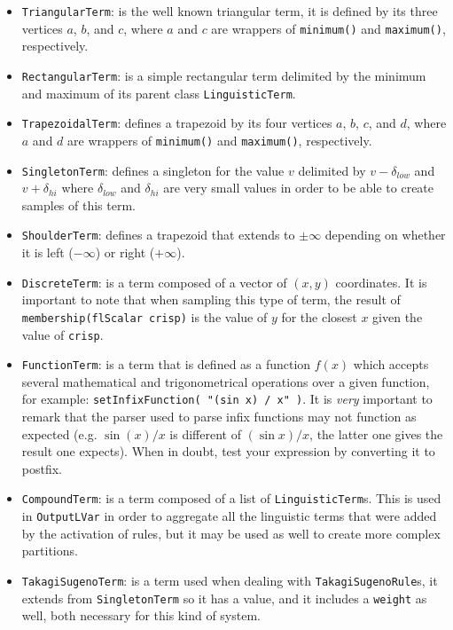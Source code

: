 			\begin{itemize}
				\item \texttt{TriangularTerm}: is the well known triangular term, it is defined by its three vertices $a$, $b$, and $c$, where $a$ and $c$ are wrappers of \texttt{minimum()} and \texttt{maximum()}, respectively.
				\item \texttt{RectangularTerm}: is a simple rectangular term delimited by the minimum and maximum of its parent class \texttt{LinguisticTerm}.
				\item \texttt{TrapezoidalTerm}: defines a trapezoid by its four vertices $a$, $b$, $c$, and $d$, where $a$ and $d$ are wrappers of \texttt{minimum()} and \texttt{maximum()}, respectively.
				\item \texttt{SingletonTerm}: defines a singleton for the value $v$ delimited by $v - \delta_{low}$ and $v + \delta_{hi}$ where $\delta_{low}$ and $\delta_{hi}$ are very small values in order to be able to create samples of this term.
				\item \texttt{ShoulderTerm}: defines a trapezoid that extends to $\pm\infty$  depending on whether it is left ($-\infty$) or right ($+\infty$).
				\item \texttt{DiscreteTerm}: is a term composed of a vector of $(x,y)$ coordinates.  It is important to note that when sampling this type of term, the result of \texttt{membership(flScalar crisp)} is the value of $y$ for the closest $x$ given the value of \texttt{crisp}.
				\item \texttt{FunctionTerm}: is a term that is defined as a function $f(x)$ which accepts several mathematical and trigonometrical operations over a given function, for example: \texttt{setInfixFunction( "(sin x) / x" )}. It is \emph{very} important to remark that the parser used to parse infix functions may not function as expected (e.g. $\sin (x) / x$ is different of $(\sin x) / x$, the latter one gives the result one expects). When in doubt, test your expression by converting it to postfix.
				\item \texttt{CompoundTerm}: is a term composed of a list of \texttt{LinguisticTerm}s. This is used in \texttt{OutputLVar} in order to aggregate all the linguistic terms that were added by the activation of rules, but it may be used as well to create more complex partitions.
				\item \texttt{TakagiSugenoTerm}: is a term used when dealing with \texttt{TakagiSugenoRule}s, it extends from \texttt{SingletonTerm} so it has a value, and it  includes a \texttt{weight} as well, both necessary for this kind of system.
			\end{itemize}

